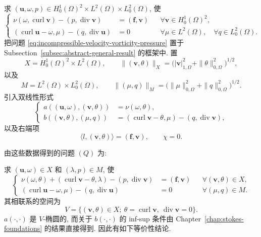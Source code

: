 求 $(\mathbf u,\omega,p)
\in H_0^1(\Omega)^2\times L^2(\Omega)\times L_0^2(\Omega)$, 使
\begin{equation}\label{eq:incompressible-velocity-vorticity-pressure}
\left\{
\begin{aligned}
\nu(\omega,\operatorname{curl}\mathbf v)
-(p,\operatorname{div}\mathbf v)
&=(\mathbf f,\mathbf v)
&&\forall\mathbf v\in H_0^1(\Omega)^2,\\
(\operatorname{curl}\mathbf u-\omega,\mu)
-(q,\operatorname{div}\mathbf u)
&=0
&&\forall\mu\in L^2(\Omega),\quad
\forall q\in L_0^2(\Omega).
\end{aligned}
\right.
\end{equation}
把问题 \eqref{eq:incompressible-velocity-vorticity-pressure}
置于 Subsection~\ref{subsec:abstract-general-result} 的框架中.
置
\[
X=H_0^1(\Omega)^2\times L^2(\Omega),
\qquad
\|(\mathbf v,\theta)\|_X
=\bigl(|\mathbf v|_{1,\Omega}^2+\|\theta\|_{0,\Omega}^2\bigr)^{1/2},
\]
以及
\[
M=L^2(\Omega)\times L_0^2(\Omega),
\qquad
\|(\mu,q)\|_M
=\bigl(\|\mu\|_{0,\Omega}^2+\|q\|_{0,\Omega}^2\bigr)^{1/2}.
\]
引入双线性形式
\begin{equation}\label{eq:incompressible-sfvp-abstract-forms}
\left\{
\begin{aligned}
a((\mathbf u,\omega),(\mathbf v,\theta))
&=\nu(\omega,\theta),\\
b((\mathbf v,\theta),(\mu,q))
&=(\operatorname{curl}\mathbf v-\theta,\mu)
-(q,\operatorname{div}\mathbf v),
\end{aligned}
\right.
\end{equation}
以及右端项
\begin{equation}\label{eq:incompressible-sfvp-abstract-data}
\langle l,(\mathbf v,\theta)\rangle=(\mathbf f,\mathbf v),
\qquad
\chi=0.
\end{equation}

由这些数据得到的问题 $(Q)$ 为:

求 $(\mathbf u,\omega)\in X$ 和 $(\lambda,p)\in M$, 使
\begin{equation}\label{eq:incompressible-sfvp-four-field}
\left\{
\begin{aligned}
\nu(\omega,\theta)
+(\operatorname{curl}\mathbf v-\theta,\lambda)
-(p,\operatorname{div}\mathbf v)
&=(\mathbf f,\mathbf v)
&&\forall(\mathbf v,\theta)\in X,\\
(\operatorname{curl}\mathbf u-\omega,\mu)
-(q,\operatorname{div}\mathbf u)
&=0
&&\forall(\mu,q)\in M.
\end{aligned}
\right.
\end{equation}
其相联系的空间为
\[
V=\{(\mathbf v,\theta)\in X;\
\theta=\operatorname{curl}\mathbf v,\
\operatorname{div}\mathbf v=0\}.
\]
$a(\cdot,\cdot)$ 是 $V$-椭圆的,
而关于 $b(\cdot,\cdot)$ 的 inf-sup 条件由
Chapter~\ref{chap:stokes-foundations} 的结果直接得到.
因此有如下等价性结论.

